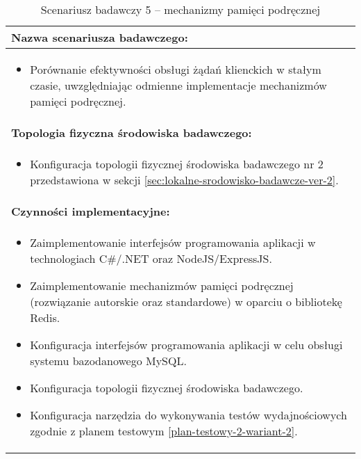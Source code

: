 \setlength{\LTcapwidth}{\textwidth}
\setlength\LTleft{0pt}
\setlength\LTright{0pt}
\begin{longtable}[c]{|llll|}
    \caption{Scenariusz badawczy 5 -- mechanizmy pamięci podręcznej}
    \label{tab:research-scenario-5}                                                  \\ \hline
    \multicolumn{4}{|l|}{\textbf{Nazwa scenariusza badawczego:}}                     \\ \hline
    \multicolumn{4}{|p{\linewidth}|}{
        \begin{itemize}[label={}]
            \item Porównanie efektywności obsługi żądań klienckich w stałym czasie, uwzględniając odmienne implementacje mechanizmów pamięci podręcznej.
          \end{itemize}
    } \\ \hline
    \multicolumn{4}{|l|}{\textbf{Topologia fizyczna środowiska badawczego:}}         \\ \hline
    \multicolumn{4}{|p{\linewidth}|}{
        \begin{itemize}[label={}]
            \item Konfiguracja topologii fizycznej środowiska badawczego nr 2 przedstawiona w sekcji \ref{sec:lokalne-srodowisko-badawcze-ver-2}.
          \end{itemize}
    }\\ \hline
    \multicolumn{4}{|l|}{\textbf{Czynności implementacyjne:}}                        \\ \hline
    \multicolumn{4}{|p{\linewidth}|}{
        \begin{itemize}
            \item Zaimplementowanie interfejsów programowania aplikacji w technologiach C\#/.NET oraz NodeJS/ExpressJS.
            \item Zaimplementowanie mechanizmów pamięci podręcznej (rozwiązanie autorskie oraz standardowe) w oparciu o bibliotekę Redis.
            \item Konfiguracja interfejsów programowania aplikacji w celu obsługi systemu bazodanowego MySQL.
            \item Konfiguracja topologii fizycznej środowiska badawczego.
            \item Konfiguracja narzędzia do wykonywania testów wydajnościowych zgodnie z planem testowym \ref{plan-testowy-2-wariant-2}.
        \end{itemize}}                                                           \\ \hline

\end{longtable}
